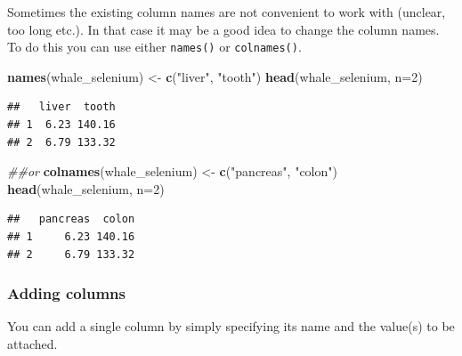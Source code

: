 \documentclass[]{book}
\newenvironment{Shaded}{\begin{snugshade}}{\end{snugshade}}
\newcommand{\CommentTok}[1]{\textcolor[rgb]{0.56,0.35,0.01}{\textit{#1}}}
\newcommand{\DataTypeTok}[1]{\textcolor[rgb]{0.13,0.29,0.53}{#1}}
\newcommand{\DecValTok}[1]{\textcolor[rgb]{0.00,0.00,0.81}{#1}}
\newcommand{\KeywordTok}[1]{\textcolor[rgb]{0.13,0.29,0.53}{\textbf{#1}}}
\newcommand{\NormalTok}[1]{#1}
\newcommand{\OperatorTok}[1]{\textcolor[rgb]{0.81,0.36,0.00}{\textbf{#1}}}
\newcommand{\StringTok}[1]{\textcolor[rgb]{0.31,0.60,0.02}{#1}}
\begin{document}
Sometimes the existing column names are not convenient to work with (unclear, too long etc.). In that case it may be a good idea to change the column names. To do this you can use either \texttt{names()} or \texttt{colnames()}.

\begin{Shaded}
\begin{Highlighting}[]
\KeywordTok{names}\NormalTok{(whale_selenium) <-}\StringTok{ }\KeywordTok{c}\NormalTok{(}\StringTok{"liver"}\NormalTok{, }\StringTok{"tooth"}\NormalTok{)}
\KeywordTok{head}\NormalTok{(whale_selenium, }\DataTypeTok{n=}\DecValTok{2}\NormalTok{)}
\end{Highlighting}
\end{Shaded}

\begin{verbatim}
##   liver  tooth
## 1  6.23 140.16
## 2  6.79 133.32
\end{verbatim}

\begin{Shaded}
\begin{Highlighting}[]
\CommentTok{##or}
\KeywordTok{colnames}\NormalTok{(whale_selenium) <-}\StringTok{ }\KeywordTok{c}\NormalTok{(}\StringTok{"pancreas"}\NormalTok{, }\StringTok{"colon"}\NormalTok{)}
\KeywordTok{head}\NormalTok{(whale_selenium, }\DataTypeTok{n=}\DecValTok{2}\NormalTok{)}
\end{Highlighting}
\end{Shaded}

\begin{verbatim}
##   pancreas  colon
## 1     6.23 140.16
## 2     6.79 133.32
\end{verbatim}

\hypertarget{adding-columns}{%
\subsubsection*{Adding columns}\label{adding-columns}}

You can add a single column by simply specifying its name and the value(s) to be attached.

\begin{Shaded}
\end{Shaded}
\end{document}
